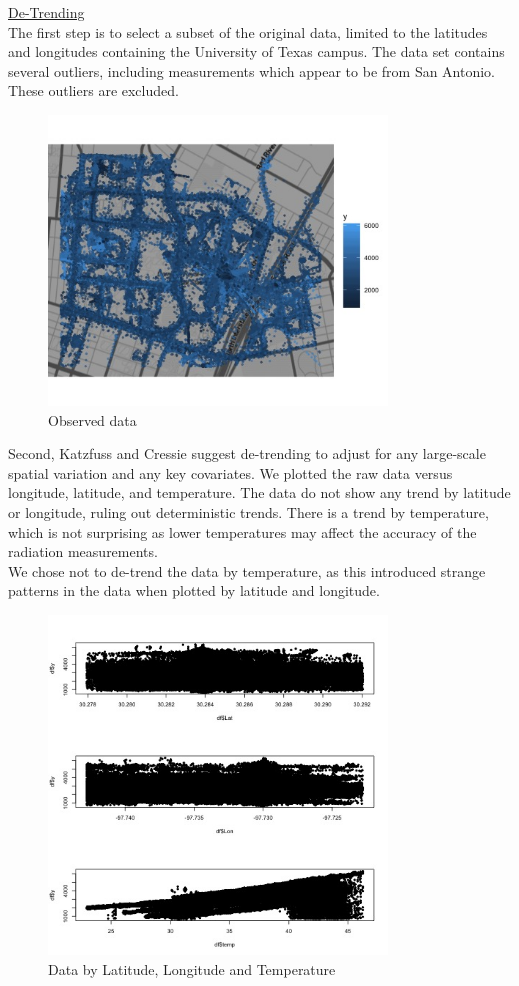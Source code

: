 \documentclass[11pt]{article}
\begin{document}
\underline{De-Trending}\\

The first step is to select a subset of the original data, limited to the latitudes and longitudes containing the University of Texas campus.  The data set contains several outliers, including measurements which appear to be from San Antonio.  These outliers are excluded. \\

\begin{figure}[h!]
\centering
\includegraphics[width=90mm,keepaspectratio]{Images/original_data_plot.jpg}
\caption{Observed data \label{fig:1}}
\end{figure}

Second, Katzfuss and Cressie suggest de-trending to adjust for any large-scale spatial variation and any key covariates.  We plotted the raw data versus longitude, latitude, and temperature.  The data do not show any trend by latitude or longitude, ruling out deterministic trends.  There is a trend by temperature, which is not surprising as lower temperatures may affect the accuracy of the radiation measurements. \\

We chose not to de-trend the data by temperature, as this introduced strange patterns in the data when plotted by latitude and longitude. \\

\begin{figure}[h!]
\centering
\includegraphics[width=90mm,keepaspectratio]{Images/detrending_plots.jpg}
\caption{Data by Latitude, Longitude and Temperature \label{fig:2}}
\end{figure}
\end{document}
